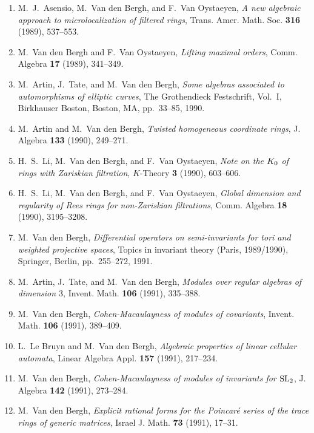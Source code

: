 \begin{enumerate}
\item
M.~J.~Asensio, M.~Van den Bergh, and F.~Van Oystaeyen, {\em A new algebraic approach to microlocalization of filtered rings}, Trans. Amer. Math. Soc. {\bf 316} (1989), 537--553.

\item
M.~Van den Bergh and F.~Van Oystaeyen, {\em Lifting maximal orders}, Comm. Algebra {\bf 17} (1989), 341--349.

\item
M.~Artin, J.~Tate, and M.~Van den Bergh, {\em Some algebras associated to automorphisms of elliptic curves}, The Grothendieck Festschrift, Vol.\ I, Birkhauser Boston, Boston, MA, pp.~33--85, 1990.

\item
M.~Artin and M.~Van den Bergh, {\em Twisted homogeneous coordinate rings}, J. Algebra {\bf 133} (1990), 249--271.

\item
H.~S.~Li, M.~Van den Bergh, and F.~Van Oystaeyen, {\em Note on the $K\sb 0$ of rings with Zariskian filtration}, $K$-Theory {\bf 3} (1990), 603--606.

\item
H.~S.~Li, M.~Van den Bergh, and F.~Van Oystaeyen, {\em Global dimension and regularity of Rees rings for non-Zariskian filtrations}, Comm. Algebra {\bf 18} (1990), 3195--3208.

\item
M.~Van den Bergh, {\em Differential operators on semi-invariants for tori and weighted projective spaces}, Topics in invariant theory (Paris, 1989/1990), Springer, Berlin, pp.~255--272, 1991.

\item
M.~Artin, J.~Tate, and M.~Van den Bergh, {\em Modules over regular algebras of dimension $3$}, Invent. Math. {\bf 106} (1991), 335--388.

\item
M.~Van den Bergh, {\em Cohen-Macaulayness of modules of covariants}, Invent. Math. {\bf 106} (1991), 389--409.

\item
L.~Le Bruyn and M.~Van den Bergh, {\em Algebraic properties of linear cellular automata}, Linear Algebra Appl. {\bf 157} (1991), 217--234.

\item
M.~Van den Bergh, {\em Cohen-Macaulayness of modules of invariants for $\rm SL\sb 2$}, J. Algebra {\bf 142} (1991), 273--284.

\item
M.~Van den Bergh, {\em Explicit rational forms for the Poincar\'e series of the trace rings of generic matrices}, Israel J. Math. {\bf 73} (1991), 17--31.


\end{enumerate}
